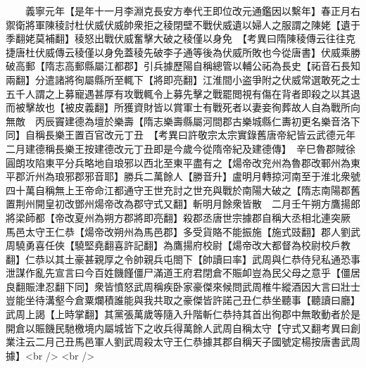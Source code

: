 　　義寧元年【是年十一月李淵克長安方奉代王即位改元通鑑因以繫年】春正月右禦衛將軍陳稜討杜伏威伏威帥衆拒之稜閉壁不戰伏威遺以婦人之服謂之陳姥【遺于季翻姥莫補翻】稜怒出戰伏威奮擊大破之稜僅以身免　【考異曰隋陳稜傳云往往克捷唐杜伏威傳云稜僅以身免蓋稜先破李子通等後為伏威所敗也今從唐書】伏威乘勝破高郵【隋志高郵縣屬江都郡】引兵據歷陽自稱總管以輔公祏為長史【祏音石長知兩翻】分遣諸將徇屬縣所至輒下【將即亮翻】江淮間小盗爭附之伏威常選敢死之士五千人謂之上募寵遇甚厚有攻戰輒令上募先擊之戰罷閲視有傷在背者即殺之以其退而被擊故也【被皮義翻】所獲資財皆以賞軍士有戰死者以妻妾徇葬故人自為戰所向無敵　丙辰竇建德為壇於樂壽【隋志樂壽縣屬河間郡古樂城縣仁夀初更名樂音洛下同】自稱長樂王置百官改元丁丑　【考異曰許敬宗太宗實錄舊唐帝紀皆云武德元年二月建德稱長樂王按建德改元丁丑即是今歲今從隋帝紀及建德傳】　辛巳魯郡賊徐圓朗攻陷東平分兵略地自琅邪以西北至東平盡有之【煬帝改兖州為魯郡改鄆州為東平郡沂州為琅邪郡邪音耶】勝兵二萬餘人【勝音升】盧明月轉掠河南至于淮北衆號四十萬自稱無上王帝命江都通守王世充討之世充與戰於南陽大破之【隋志南陽郡舊置荆州開皇初改鄧州煬帝改為郡守式又翻】斬明月餘衆皆散　二月壬午朔方鷹揚郎將梁師都【帝改夏州為朔方郡將即亮翻】殺郡丞唐世宗據郡自稱大丞相北連突厥　馬邑太守王仁恭【煬帝改朔州為馬邑郡】多受貨賂不能振施【施式豉翻】郡人劉武周驍勇喜任俠【驍堅堯翻喜許記翻】為鷹揚府校尉【煬帝改大都督為校尉校戶教翻】仁恭以其土豪甚親厚之令帥親兵屯閤下【帥讀曰率】武周與仁恭侍兒私通恐事泄謀作亂先宣言曰今百姓饑饉僵尸滿道王府君閉倉不賑卹豈為民父母之意乎【僵居良翻賑津忍翻下同】衆皆憤怒武周稱疾卧家豪傑來候問武周椎牛縱酒因大言曰壯士豈能坐待溝壑今倉粟爛積誰能與我共取之豪傑皆許諾己丑仁恭坐聽事【聽讀曰廳】武周上謁【上時掌翻】其黨張萬歲等隨入升階斬仁恭持其首出徇郡中無敢動者於是開倉以賑饑民馳檄境内屬城皆下之收兵得萬餘人武周自稱太守【守式又翻考異曰創業注云二月己丑馬邑軍人劉武周殺太守王仁恭據其郡自稱天子國號定楊按唐書武周據】<br />
<br />
